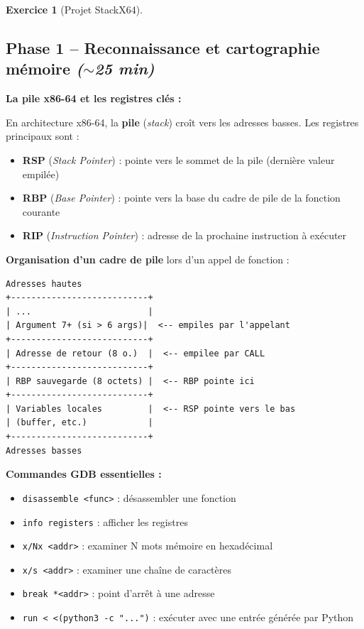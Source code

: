 \documentclass[a4paper,11pt]{article}
\theoremstyle{plain}
\theoremstyle{definition}
\newtheorem{exercice}{Exercice}
\begin{document}
\begin{exercice}[Projet StackX64]$\;$


\subsection*{Phase 1 -- Reconnaissance et cartographie mémoire \hfill\normalfont\textit{($\sim$25 min)}}

\begin{rappel}
\textbf{La pile x86-64 et les registres clés :}

En architecture x86-64, la \textbf{pile} (\textit{stack}) croît vers les adresses basses. Les registres principaux sont :
\begin{itemize}
    \item \textbf{RSP} (\textit{Stack Pointer}) : pointe vers le sommet de la pile (dernière valeur empilée)
    \item \textbf{RBP} (\textit{Base Pointer}) : pointe vers la base du cadre de pile de la fonction courante
    \item \textbf{RIP} (\textit{Instruction Pointer}) : adresse de la prochaine instruction à exécuter
\end{itemize}

\medskip
\textbf{Organisation d'un cadre de pile} lors d'un appel de fonction :
\begin{lstlisting}[style=GDBStyle]
Adresses hautes
+---------------------------+
| ...                       |
| Argument 7+ (si > 6 args)|  <-- empiles par l'appelant
+---------------------------+
| Adresse de retour (8 o.)  |  <-- empilee par CALL
+---------------------------+
| RBP sauvegarde (8 octets) |  <-- RBP pointe ici
+---------------------------+
| Variables locales         |  <-- RSP pointe vers le bas
| (buffer, etc.)            |
+---------------------------+
Adresses basses
\end{lstlisting}

\medskip
\textbf{Commandes GDB essentielles :}
\begin{itemize}
    \item \texttt{disassemble <func>} : désassembler une fonction
    \item \texttt{info registers} : afficher les registres
    \item \texttt{x/Nx <addr>} : examiner N mots mémoire en hexadécimal
    \item \texttt{x/s <addr>} : examiner une chaîne de caractères
    \item \texttt{break *<addr>} : point d'arrêt à une adresse
    \item \texttt{run < <(python3 -c "...")} : exécuter avec une entrée générée par Python
\end{itemize}
\end{rappel}


\end{exercice}
\end{document}
